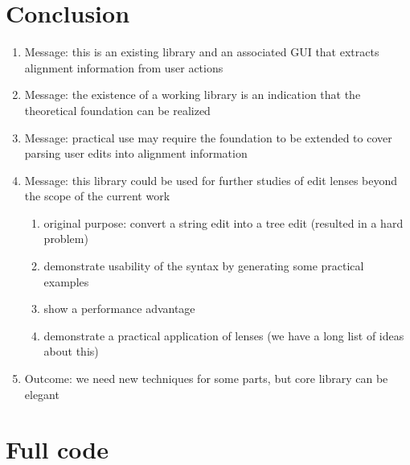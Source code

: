 \section{Conclusion}
\label{sec:impl-conclusion}
\begin{enumerate}
    \item Message: this is an existing library and an associated GUI that extracts alignment information from user actions
    \item Message: the existence of a working library is an indication that the theoretical foundation can be realized
    \item Message: practical use may require the foundation to be extended to cover parsing user edits into alignment information
    \item Message: this library could be used for further studies of edit lenses beyond the scope of the current work
        \begin{enumerate}
            \item original purpose: convert a string edit into a tree edit (resulted in a hard problem)
            \item demonstrate usability of the syntax by generating some practical examples
            \item show a performance advantage
            \item demonstrate a practical application of lenses (we have a long list of ideas about this)
        \end{enumerate}
    \item Outcome: we need new techniques for some parts, but core library can be elegant
\end{enumerate}

\section{Full code}
\label{sec:impl-code}
\footnotesize

\normalsize
